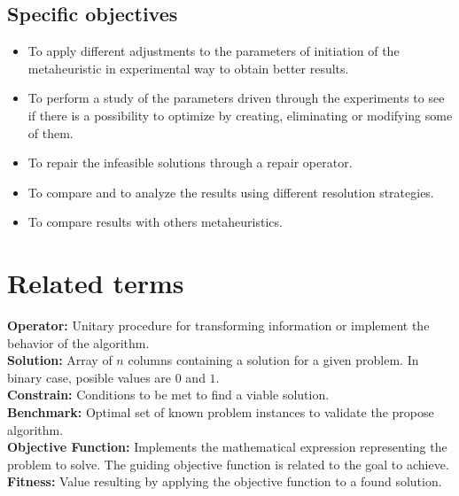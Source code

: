 \subsection{Specific objectives}
\begin{itemize}
\item To apply different adjustments to the parameters of initiation of the metaheuristic in experimental way to obtain better results.

\item To perform a study of the parameters driven through the experiments to see if there is a possibility to optimize by creating, eliminating or modifying some of them.

\item To repair the infeasible solutions through a repair operator.

\item To compare and to analyze the results using different resolution strategies.

\item To compare results with others metaheuristics.
\end{itemize}



\section{Related terms}

\textbf{Operator:} 
Unitary procedure for transforming information or implement the behavior of the algorithm.\\

\textbf{Solution:} 
Array of $n$ columns containing a solution for a given problem. In binary case, posible values are $0$ and $1$.\\

\textbf{Constrain:} 
Conditions to be met to find a viable solution.\\

\textbf{Benchmark:} 
Optimal set of known problem instances to validate the propose algorithm.\\

\textbf{Objective Function:}  
Implements the mathematical expression representing the problem to solve. The guiding objective function is related to the goal to achieve.\\

\textbf{Fitness:} 
Value resulting by applying the objective function to a found solution.\\

